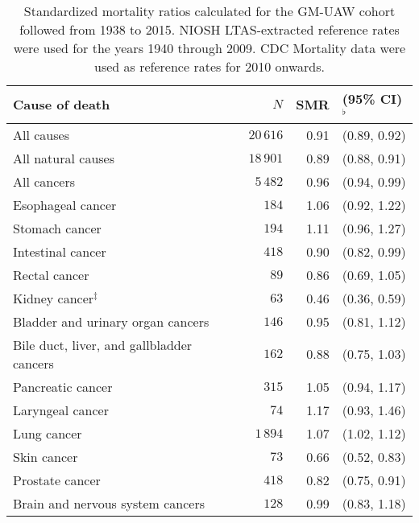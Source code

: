 \documentclass[]{article}
\begin{document}
\begin{table}[H]
\centering
\caption{Standardized mortality ratios calculated for the GM-UAW cohort followed from 1938 to 2015. NIOSH LTAS-extracted reference rates were used for the years 1940 through 2009. CDC Mortality data were used as reference rates for 2010 onwards.} 
\begin{tabular}{lrrl}
  \toprule
Cause of death & $N$ & SMR & (95\% CI)$^\flat$ \\ 
  \midrule
All causes & $20\,616$ & 0.91 &  (0.89, 0.92) \\ 
  All natural causes & $18\,901$ & 0.89 &  (0.88, 0.91) \\ 
  All cancers & $5\,482$ & 0.96 &  (0.94, 0.99) \\ 
  \hspace{10pt}Esophageal cancer & $184$ & 1.06 &  (0.92, 1.22) \\ 
  \hspace{10pt}Stomach cancer & $194$ & 1.11 &  (0.96, 1.27) \\ 
  \hspace{10pt}Intestinal cancer & $418$ & 0.90 &  (0.82, 0.99) \\ 
  \hspace{10pt}Rectal cancer & $89$ & 0.86 &  (0.69, 1.05) \\ 
  \hspace{10pt}Kidney cancer$^\ddagger$ & $63$ & 0.46 &  (0.36, 0.59) \\ 
  \hspace{10pt}Bladder and urinary organ cancers & $146$ & 0.95 &  (0.81, 1.12) \\ 
  \hspace{10pt}Bile duct, liver, and gallbladder cancers & $162$ & 0.88 &  (0.75, 1.03) \\ 
  \hspace{10pt}Pancreatic cancer & $315$ & 1.05 &  (0.94, 1.17) \\ 
  \hspace{10pt}Laryngeal cancer & $74$ & 1.17 &  (0.93, 1.46) \\ 
  \hspace{10pt}Lung cancer & $1\,894$ & 1.07 &  (1.02, 1.12) \\ 
  \hspace{10pt}Skin cancer & $73$ & 0.66 &  (0.52, 0.83) \\ 
  \hspace{10pt}Prostate cancer & $418$ & 0.82 &  (0.75, 0.91) \\ 
  \hspace{10pt}Brain and nervous system cancers & $128$ & 0.99 &  (0.83, 1.18) \\ 

\end{tabular}
\end{table}
\end{document}
